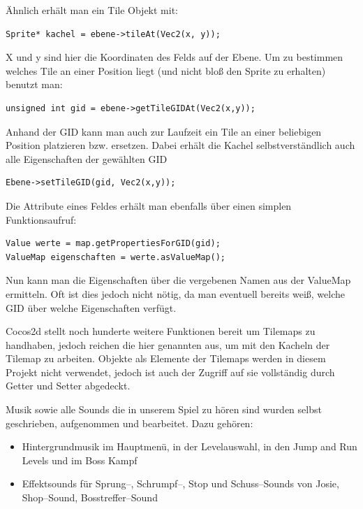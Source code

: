 Ähnlich erhält man ein Tile Objekt mit:

\begin{lstlisting}[style=singleline]
Sprite* kachel = ebene->tileAt(Vec2(x, y));
\end{lstlisting}

X und y sind hier die Koordinaten des Felds auf der Ebene.
Um zu bestimmen welches Tile an einer Position liegt (und nicht bloß den Sprite zu erhalten) benutzt man:

\begin{lstlisting}[style=singleline]
unsigned int gid = ebene->getTileGIDAt(Vec2(x,y));
\end{lstlisting}

Anhand der GID kann man auch zur Laufzeit ein Tile an einer beliebigen Position platzieren bzw. ersetzen. Dabei erhält die Kachel selbstverständlich auch alle Eigenschaften der gewählten GID	

\begin{lstlisting}[style=singleline]
Ebene->setTileGID(gid, Vec2(x,y));
\end{lstlisting}

Die Attribute eines Feldes erhält man ebenfalls über einen simplen Funktionsaufruf:

\begin{lstlisting}[style=singleline]
Value werte = map.getPropertiesForGID(gid);
ValueMap eigenschaften = werte.asValueMap();
\end{lstlisting}

Nun kann man die Eigenschaften über die vergebenen Namen aus der ValueMap ermitteln. Oft ist dies jedoch nicht nötig, da man eventuell bereits weiß, welche GID über welche Eigenschaften verfügt.

Cocos2d stellt noch hunderte weitere Funktionen bereit um Tilemaps zu handhaben, jedoch reichen die hier genannten aus, um mit den Kacheln der Tilemap zu arbeiten. Objekte als Elemente der Tilemaps werden in diesem Projekt nicht verwendet, jedoch ist auch der Zugriff auf sie vollständig durch Getter und Setter abgedeckt.



\label{sec:2_Musik}
Musik sowie alle Sounds die in unserem Spiel \gamename zu hören sind wurden selbst geschrieben, aufgenommen und bearbeitet. Dazu gehören:

\begin{itemize}
\item Hintergrundmusik im Hauptmenü, in der Levelauswahl, in den Jump and Run Levels und im Boss Kampf
\item Effektsounds für Sprung--, Schrumpf--, Stop und Schuss--Sounds von Josie, Shop--Sound, Bosstreffer--Sound
\end{itemize}


